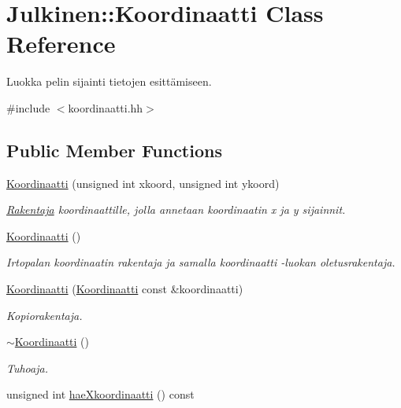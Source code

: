 \hypertarget{class_julkinen_1_1_koordinaatti}{}\section{Julkinen\+:\+:Koordinaatti Class Reference}
\label{class_julkinen_1_1_koordinaatti}


Luokka pelin sijainti tietojen esittämiseen.  




{\ttfamily \#include $<$koordinaatti.\+hh$>$}

\subsection*{Public Member Functions}
\begin{DoxyCompactItemize}
\item 
\hyperlink{class_julkinen_1_1_koordinaatti_a92d3b7f8413ed5658d63792288a2499b}{Koordinaatti} (unsigned int xkoord, unsigned int ykoord)
\begin{DoxyCompactList}\small\item\em \hyperlink{class_rakentaja}{Rakentaja} koordinaattille, jolla annetaan koordinaatin x ja y sijainnit. \end{DoxyCompactList}\item 
\hyperlink{class_julkinen_1_1_koordinaatti_a37ffaf231dcf9e03627fb8cc994dae8b}{Koordinaatti} ()
\begin{DoxyCompactList}\small\item\em Irtopalan koordinaatin rakentaja ja samalla koordinaatti -\/luokan oletusrakentaja. \end{DoxyCompactList}\item 
\hyperlink{class_julkinen_1_1_koordinaatti_a45f76044b43df8a5561206f3fdd8f0ad}{Koordinaatti} (\hyperlink{class_julkinen_1_1_koordinaatti}{Koordinaatti} const \&koordinaatti)
\begin{DoxyCompactList}\small\item\em Kopiorakentaja. \end{DoxyCompactList}\item 
\hyperlink{class_julkinen_1_1_koordinaatti_a70f00df4c581696cf14692bd717bbef6}{$\sim$\+Koordinaatti} ()
\begin{DoxyCompactList}\small\item\em Tuhoaja. \end{DoxyCompactList}\item 
unsigned int \hyperlink{class_julkinen_1_1_koordinaatti_ae5b96350846feb6b86a2f7cf72c7e429}{hae\+Xkoordinaatti} () const 

\end{DoxyCompactItemize}
